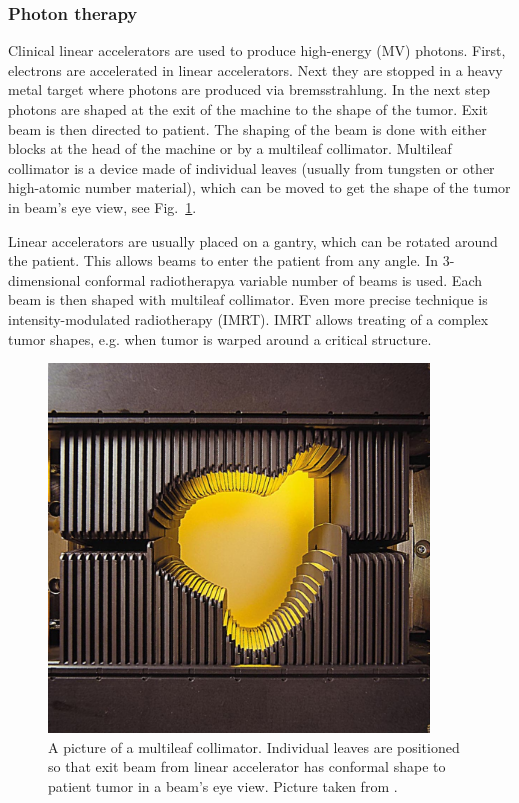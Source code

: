 \documentclass[type=dr, dr=rernat, accentcolor=tud7b,colorbacktitle, bigchapter, openright, twoside, 12pt ]{tudthesis}
\begin{document}
\subsubsection{Photon therapy}

Clinical linear accelerators are used to produce high-energy (MV) photons. First, electrons are accelerated in linear accelerators. Next they are stopped in a heavy metal target where photons are produced via bremsstrahlung.
In the next step photons are shaped at the exit of the machine to the shape of the tumor. Exit beam is then directed to patient. The shaping of the beam is done with either blocks at the head of the machine or by a 
multileaf collimator. Multileaf collimator is a device made of individual leaves (usually from tungsten or other high-atomic number material), which can be moved to get the shape of the tumor in beam's eye view, see Fig.~\ref{MLC}. 

Linear accelerators are usually placed on a gantry, which can be rotated around the patient. This allows beams to enter the patient from any angle. In 3-dimensional conformal radiotherapya  variable number of beams is used. 
Each beam is then shaped with multileaf collimator. Even more precise technique is intensity-modulated radiotherapy (IMRT). IMRT allows treating of a complex tumor shapes, e.g. when tumor is warped around a critical structure.

\begin{figure}[H]
\begin{center}
\includegraphics[width=0.9\textwidth]{./Images/MLC.png}
\caption{A picture of a multileaf collimator. Individual leaves are positioned so that exit beam from linear accelerator has conformal shape to patient tumor in a beam's eye view. Picture taken from \cite{MLC}.}
\label{MLC}
\end{center}
\end{figure}
\end{document}
